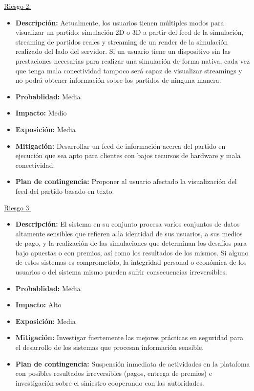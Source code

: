 \documentclass[a4paper, 10pt, twoside]{article}
\newcommand{\riesgo}[7]{
  \underline{Riesgo {#1}:}
  \begin{itemize}   
    \item \textbf{Descripción:} {#2}
    \item \textbf{Probablidad:} {#3}
    \item \textbf{Impacto:} {#4}
    \item \textbf{Exposición:} {#5}
    \item \textbf{Mitigación:} {#6}
    \item \textbf{Plan de contingencia:} {#7}
  \end{itemize}
}
\begin{document}
\riesgo{2}
    {Actualmente, los usuarios tienen múltiples modos para visualizar un partido: simulación 2D o 3D a partir del feed de la simulación, streaming de partidos reales y streaming de un render de la simulación realizado del lado del servidor. Si un usuario tiene un dispositivo sin las prestaciones necesarias para realizar una simulación de forma nativa, cada vez que tenga mala conectividad tampoco será capaz de visualizar streamings y no podrá obtener información sobre los partidos de ninguna manera. }
    {Media} %
    {Medio} %
    {Media} %
    {Desarrollar un feed de información acerca del partido en ejecución que sea apto para clientes con bajos recursos de hardware y mala conectividad.}
    {Proponer al usuario afectado la visualización del feed del partido basado en texto.}

\riesgo{3}
    {El sistema en su conjunto procesa varios conjuntos de datos altamente sensibles que refieren a la identidad de sus usuarios, a sus medios de pago, y la realización de las simulaciones que determinan los desafíos para bajo apuestas o con premios, así como los resultados de los mismos. Si alguno de estos sistemas es comprometido, la integridad personal o económica de los usuarios o del sistema mismo pueden sufrir consecuencias irreversibles. }
    {Media} %
    {Alto} %
    {Media} %
    {Investigar fuertemente las mejores prácticas en seguridad para el desarrollo de los sistemas que procesan información sensible.}
    {Suspensión inmediata de actividades en la platafoma con posibles resultados irreversibles (pagos, entrega de premios) e investigación sobre el siniestro cooperando con las autoridades.}

\newpage
\end{document}
